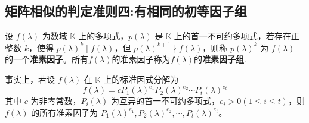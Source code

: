 \documentclass[../../main.tex]{subfiles}
\begin{document}
\subsection{矩阵相似的判定准则四:有相同的初等因子组}

\begin{definition}[准素因子]\label{definition:一般数域上的的准素因子}
设 \(f(\lambda)\) 为数域 \(\mathbb{K}\) 上的多项式，\(p(\lambda)\) 是 \(\mathbb{K}\) 上的首一不可约多项式，若存在正整数 \(k\)，使得 \(p(\lambda)^k\mid f(\lambda)\)，但 \(p(\lambda)^{k + 1}\nmid f(\lambda)\)，则称 \(p(\lambda)^k\) 为 \(f(\lambda)\) 的一个\textbf{准素因子}。所有$f(\lambda)$的准素因子称为$f(\lambda)$的\textbf{准素因子组}.

事实上，若设 \(f(\lambda)\) 在 \(\mathbb{K}\) 上的标准因式分解为
\[
f(\lambda)=cP_1(\lambda)^{e_1}P_2(\lambda)^{e_2}\cdots P_t(\lambda)^{e_t}
\]
其中 \(c\) 为非零常数，\(P_i(\lambda)\) 为互异的首一不可约多项式，\(e_i>0(1\leq i\leq t)\)，则 \(f(\lambda)\) 的所有准素因子为 \(P_1(\lambda)^{e_1},P_2(\lambda)^{e_2},\cdots,P_t(\lambda)^{e_t}\)。
\end{definition}
\end{document}
